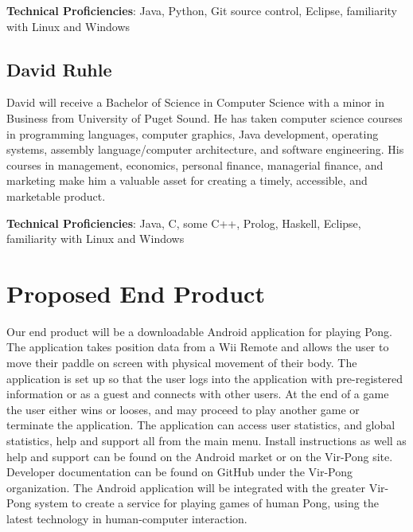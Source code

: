 \documentclass[12pt]{article}
\begin{document}
\vspace*{5mm}

\noindent \textbf{Technical Proficiencies}: Java, Python, Git source control, Eclipse, familiarity with Linux and Windows

\subsection{David Ruhle}
\noindent David will receive a Bachelor of Science in Computer Science with a minor in Business from University of Puget Sound. He has taken computer science courses in programming languages, computer graphics,
Java development, operating systems, assembly language/computer architecture, and software
engineering. His courses in management, economics, personal finance, managerial finance, and marketing make him a valuable asset for creating a timely, accessible, and marketable product.

\vspace*{5mm}

\noindent \textbf{Technical Proficiencies}: Java, C, some C++, Prolog, Haskell, Eclipse, familiarity with Linux and Windows

\section{Proposed End Product}
Our end product will be a downloadable Android application for playing Pong.  The application takes position data from a Wii Remote and allows the user to move their paddle on screen with physical movement of their body.  The application is set up so that the user logs into the application with pre-registered information or as a guest and connects with other users.  At the end of a game the user either wins or looses, and may proceed to play another game or terminate the application.  The application can access user statistics, and global statistics, help and support all from the main menu.  Install instructions as well as help and support can be found on the Android market or on the Vir-Pong site. Developer documentation can be found on GitHub under the Vir-Pong organization.  The Android application will be integrated with the greater Vir-Pong system to create a service for playing games of human Pong, using the latest technology in human-computer interaction.
\end{document}
